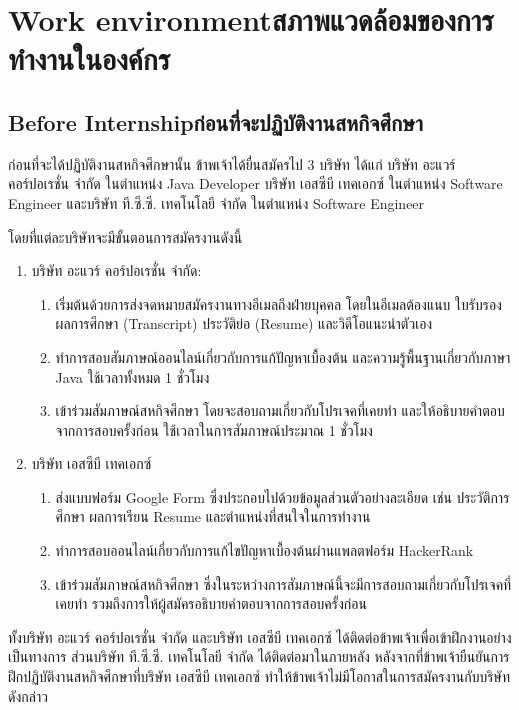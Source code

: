\chapter{\ifenglish Work environment\else สภาพแวดล้อมของการทำงานในองค์กร\fi}

\section{\ifenglish Before Internship\else ก่อนที่จะปฏิบัติงานสหกิจศึกษา\fi}
ก่อนที่จะได้ปฏิบัติงานสหกิจศึกษานั้น ข้าพเจ้าได้ยื่นสมัครไป 3 บริษัท ได้แก่ บริษัท อะแวร์ คอร์ปอเรชั่น จำกัด ในตำแหน่ง Java Developer บริษัท เอสซีบี เทคเอกซ์ ในตำแหน่ง Software Engineer และบริษัท ที.ซี.ซี. เทคโนโลยี จำกัด ในตำแหน่ง Software Engineer 

โดยที่แต่ละบริษัทจะมีขั้นตอนการสมัครงานดังนี้
\begin{enumerate}
    \item บริษัท อะแวร์ คอร์ปอเรชั่น จำกัด: 
    \begin{enumerate}
        \item เริ่มต้นด้วยการส่งจดหมายสมัครงานทางอีเมลถึงฝ่ายบุคคล โดยในอีเมลต้องแนบ ใบรับรองผลการศึกษา (Transcript) ประวัติย่อ (Resume) และวิดีโอแนะนำตัวเอง
        \item ทำการสอบสัมภาษณ์ออนไลน์เกี่ยวกับการแก้ปัญหาเบื้องต้น และความรู้พื้นฐานเกี่ยวกับภาษา Java ใช้เวลาทั้งหมด 1 ชั่วโมง
        \item เข้าร่วมสัมภาษณ์สหกิจศึกษา โดยจะสอบถามเกี่ยวกับโปรเจคที่เคยทำ และให้อธิบายคำตอบจากการสอบครั้งก่อน ใช้เวลาในการสัมภาษณ์ประมาณ 1 ชั่วโมง
    \end{enumerate}
    \item บริษัท เอสซีบี เทคเอกซ์
    \begin{enumerate}
        \item ส่งแบบฟอร์ม Google Form ซึ่งประกอบไปด้วยข้อมูลส่วนตัวอย่างละเอียด เช่น ประวัติการศึกษา ผลการเรียน Resume และตำแหน่งที่สนใจในการทำงาน
        \item ทำการสอบออนไลน์เกี่ยวกับการแก้ไขปัญหาเบื้องต้นผ่านแพลตฟอร์ม HackerRank
        \item เข้าร่วมสัมภาษณ์สหกิจศึกษา ซึ่งในระหว่างการสัมภาษณ์นี้จะมีการสอบถามเกี่ยวกับโปรเจคที่เคยทำ รวมถึงการให้ผู้สมัครอธิบายคำตอบจากการสอบครั้งก่อน
    \end{enumerate}
\end{enumerate}
ทั้งบริษัท อะแวร์ คอร์ปอเรชั่น จำกัด และบริษัท เอสซีบี เทคเอกซ์ ได้ติดต่อข้าพเจ้าเพื่อเข้าฝึกงานอย่างเป็นทางการ ส่วนบริษัท ที.ซี.ซี. เทคโนโลยี จำกัด ได้ติดต่อมาในภายหลัง หลังจากที่ข้าพเจ้ายืนยันการฝึกปฏิบัติงานสหกิจศึกษาที่บริษัท เอสซีบี เทคเอกซ์ ทำให้ข้าพเจ้าไม่มีโอกาสในการสมัครงานกับบริษัทดังกล่าว
